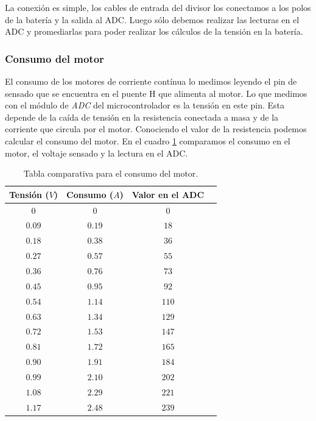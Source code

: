 La conexi\'on es simple, los cables de entrada del divisor los conectamos a los polos de la bater\'ia y la salida al ADC.
Luego s\'olo debemos realizar las lecturas en el ADC y promediarlas para poder realizar los c\'alculos de la tensi\'on en la bater\'ia.

\subsubsection{Consumo del motor}
\label{h_sensado_consumo}

El consumo de los motores de corriente cont\'inua lo medimos leyendo el pin de sensado que se encuentra en el puente H que alimenta al motor.
Lo que medimos con el m\'odulo de \emph{ADC} del microcontrolador es la tensi\'on en este pin.
Esta depende de la ca\'ida de tensi\'on en la resistencia conectada a masa y de la corriente que circula por el motor.
Conociendo el valor de la resistencia podemos calcular el consumo del motor.
En el cuadro \ref{hT_consumo} comparamos el consumo en el motor, el voltaje sensado y la lectura en el ADC.

\begin{table}[ht]
	\begin{center}
		\begin{tabular}{|c|c|c|c|}
			\hline
			Tensi\'on ($V$) & Consumo ($A$) & Valor en el ADC \\
			\hline
			$0$ & $0$ & $0$ \\
			$0.09$ & $0.19$ & $18$ \\
			$0.18$ & $0.38$ & $36$ \\
			$0.27$ & $0.57$ & $55$ \\
			$0.36$ & $0.76$ & $73$ \\
			$0.45$ & $0.95$ & $92$ \\
			$0.54$ & $1.14$ & $110$ \\
			$0.63$ & $1.34$ & $129$ \\
			$0.72$ & $1.53$ & $147$ \\
			$0.81$ & $1.72$ & $165$ \\
			$0.90$ & $1.91$ & $184$ \\
			$0.99$ & $2.10$ & $202$ \\
			$1.08$ & $2.29$ & $221$ \\
			$1.17$ & $2.48$ & $239$ \\
			\hline
		\end{tabular}
	\end{center}
	\caption{Tabla comparativa para el consumo del motor.}
	\label{hT_consumo}
\end{table}

